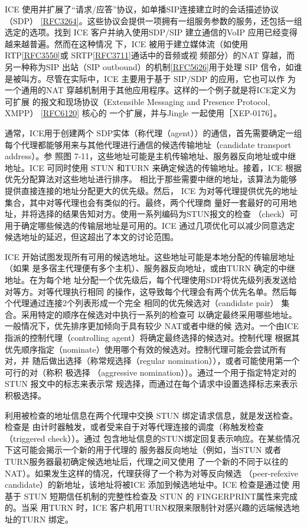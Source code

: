 ICE 使用并扩展了“请求/应答”协议，如单播SIP连接建立时的会话描述协议（SDP）
\href{https://www.rfc-editor.org/rfc/rfc3264}{[RFC3264]}。这些协议会提供一项拥有一组服务参数的服务，还包括一组选定的选项。找到
ICE 客户并纳入使用SDP/SIP 建立通信的VoIP 应用已经变得越来越普遍。然而在这种情况
下，ICE 被用于建立媒体流（如使用 RTP\href{https://www.rfc-editor.org/rfc/rfc3550}{[RFC3550]}或 SRTP\href{https://www.rfc-editor.org/rfc/rfc3711}{[RFC3711]}通话中的音频或视
频部分）的NAT 穿越，而另一种称为SIP 出站（SIP outbound）的机制\href{https://www.rfc-editor.org/rfc/rfc5626}{[RFC5626]}用于处理
SIP 信令，如谁是被叫方。尽管在实际中，ICE 主要用于基于 SIP/SDP 的应用，它也可以作
为一个通用的NAT 穿越机制用于其他应用程序。这样的一个例子就是将ICE定义为可扩展
的报文和现场协议（Extensible Messaging and Presence Protocol, XMPP） \href{https://www.rfc-editor.org/rfc/rfc6120}{[RFC6120]} 核心的
一个扩展，并与Jingle 一起使用［XEP-0176］。

通常，ICE用于创建两个 SDP实体（称代理（agent））的通信，首先需要确定一组
每个代理都能够用来与其他代理进行通信的候选传输地址（candidate transport address）。参
照图 7-11，这些地址可能是主机传输地址、服务器反向地址或中继地址。ICE 可同时使用
STUN 和TURN 来确定候选的传输地址。接着，ICE 根据优先分配算法对这些地址进行排序。
相比于那些需要中继的地址，该算法为能够提供直接连接的地址分配更大的优先级。然后，
ICE 为对等代理提供优先的地址集合，其中对等代理也会有类似的行。最终，两个代理商
量好一套最好的可用地址，并将选择的结果告知对方。使用一系列编码为STUN报文的检查
（check）可用于确定哪些候选的传输层地址是可用的。ICE 通过几项优化可以减少同意选定
候选地址的延迟，但这超出了本文的讨论范围。

ICE 开始试图发现所有可用的候选地址。这些地址可能是本地分配的传输层地址（如果
是多宿主代理便有多个主机）、服务器反向地址，或由TURN 确定的中继地址。在为每个地
址分配一个优先级后，每个代理使用SDP将优先级列表发送给对等方。对等代理执行相同
的操作，这导致每个代理会有两个优先名单。然后每个代理通过连接2个列表形成一个完全
相同的优先候选对（candidate pair） 集合。采用特定的顺序在候选对中执行一系列的检查可
以确定最终采用哪些地址。一般情况下，优先排序更加倾向于具有较少 NAT或者中继的候
选对。一个由ICE 指派的控制代理（controlling agent）将确定最终选择的候选对。控制代理
根据其优先顺序指定（nominate）使用哪个有效的候选对。控制代理可能会尝试所有对，并
随后做出选择（称常规选择（regular nomination）），或者可能使用第一个可行的对（称积
极选择 （aggressive nomination））。通过一个用于指定特定对的STUN 报文中的标志来表示常
规选择，而通过在每个请求中设置选择标志来表示积极选择。

利用被检查的地址信息在两个代理中交换 STUN 绑定请求信息，就是发送检查。检查是
由计时器触发，或者受来自于对等代理连接的调度（称触发检查（triggered check））。通过
包含地址信息的STUN绑定回复表示响应。在某些情况下这可能会揭示一个新的用于代理的
服务器反向地址（例如，当STUN 或者 TURN服务器最初确定候选地址后，代理之间又使用
了一个新的不同于以往的NAT）。如果发生这样的情况，代理获得了一个称为对等反向候选
（peer-refexive candidate）的新地址，该地址将被ICE 添加到候选地址中。ICE 检查是通过使
用基于 STUN 短期信任机制的完整性检查及 STUN 的 FINGERPRINT属性来完成的。当采
用TURN 时，ICE 客户机用TURN权限来限制针对感兴趣的远端候选地址的TURN 绑定。

